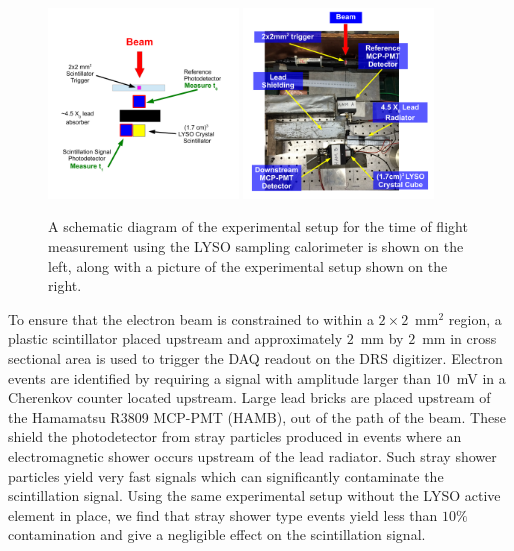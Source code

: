 \documentclass[12pt]{article}
\begin{document}
\begin{figure}[h] \centering
\includegraphics[width=0.45\textwidth]{figs/LYSOSamplingCaloSetupSchematic} 
\includegraphics[width=0.45\textwidth]{figs/LYSOSamplingCaloSetupPhoto} 
\caption{ \small A schematic diagram of the experimental setup for the
time of flight measurement using the LYSO sampling calorimeter is shown
on the left, along with a picture of the experimental setup shown on the right. } 
\label{fig:LYSOSamplingCaloSetup}
\end{figure}

To ensure that the electron beam is constrained to within a $2\times 2$~mm$^2$ region, a plastic scintillator 
placed upstream and approximately $2$~mm by $2$~mm in cross sectional area is used to trigger the DAQ readout on the DRS  digitizer. Electron events are identified by requiring a signal with amplitude larger than $10$~mV in a Cherenkov counter located upstream. 
Large lead bricks are placed upstream of the Hamamatsu R3809 MCP-PMT (HAMB),
out of the path of the beam. These shield the photodetector from stray particles
produced in events where an electromagnetic shower occurs upstream of the lead
radiator. Such stray shower particles yield very fast signals which can
significantly contaminate the scintillation signal. Using the same experimental
setup without the LYSO active element in place, we find that stray shower type
events yield less than $10\%$ contamination and give a negligible effect on the
scintillation signal. 
\end{document}
